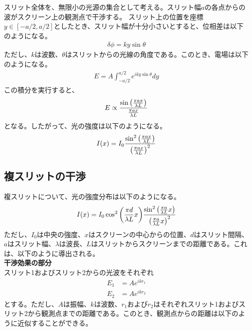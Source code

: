 \documentclass[a4paper,11pt]{jsarticle}
\begin{document}
スリット全体を、無限小の光源の集合として考える。スリット幅$a$の各点からの波がスクリーン上の観測点で干渉する。
スリット上の位置を座標$y \in [-a/2, a/2]$としたとき、スリット幅が十分小さいとすると、位相差は以下のようになる。
\begin{align}
  \delta \phi = ky\sin\theta
\end{align}
ただし、$k$は波数、$\theta$はスリットからの光線の角度である。このとき、電場は以下のようになる。
\begin{align}
  E = A\int_{-a/2}^{a/2} e^{iky\sin\theta}dy
\end{align}
この積分を実行すると、
\begin{align}
  E \propto \frac{\sin\qty(\frac{\pi a x}{\lambda L})}{\frac{\pi a x}{\lambda L}}
\end{align}
となる。したがって、光の強度は以下のようになる。
\begin{align}
  I(x) = I_0 \frac{\sin^2\qty(\frac{\pi a x}{\lambda L})}{\qty(\frac{\pi a x}{\lambda L})^2}
\end{align}

\subsection{複スリットの干渉}
複スリットについて、光の強度分布は以下のようになる。\\
\begin{align}
  I(x) = I_0 \cos^2\qty(\frac{\pi d}{\lambda L}x)\frac{\sin^2\qty(\frac{\pi a}{\lambda L}x)}{\qty(\frac{\pi a}{\lambda L}x)^2}
\end{align}
ただし、$I_0$は中央の強度、$x$はスクリーンの中心からの位置、$d$はスリット間隔、$a$はスリット幅、$\lambda$は波長、$L$はスリットからスクリーンまでの距離である。これは、以下のように導出される。\\
\textbf{干渉効果の部分}\\
スリット1およびスリット2からの光波をそれぞれ
\begin{align}
  E_1 &= Ae^{ikr_1}\\
  E_2 &= Ae^{ikr_2}
\end{align}
とする。ただし、$A$は振幅、$k$は波数、$r_1$および$r_2$はそれぞれスリット1およびスリット2から観測点までの距離である。このとき、観測点からの距離は以下のように近似することができる。
\end{document}
